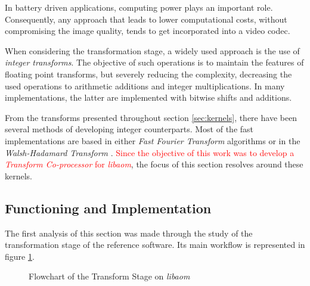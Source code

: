 In battery driven applications, computing power plays an important role. Consequently, any approach that leads to lower computational costs, without compromising the image quality, tends to get incorporated into a video codec.

When considering the transformation stage, a widely used approach is the use of \emph{integer transforms}. The objective of such operations is to maintain the features of floating point transforms, but severely reducing the complexity, decreasing the used operations to arithmetic additions and integer multiplications. In many implementations, the latter are implemented with bitwise shifts and additions.

From the transforms presented throughout section \ref{sec:kernels}, there have been several methods of developing integer counterparts. Most of the fast implementations are based in either \emph{Fast Fourier Transform} algorithms or in the \emph{Walsh-Hadamard Transform} \cite{wolterParallelArchitecturesDiscrete1992,yonghongzengIntegerDCTsFast2001}. \textcolor{red}{Since the objective of this work was to develop a \emph{Transform Co-processor} for \emph{libaom}}, the focus of this section resolves around these kernels. 

\subsection{Functioning and Implementation}

The first analysis of this section was made through the study of the transformation stage of the reference software. Its main workflow is represented in figure \ref{fig:libtrans}.

\begin{figure}[!htbp]
    \centering
    
    \caption{Flowchart of the Transform Stage on \emph{libaom}}
    \label{fig:libtrans}
\end{figure}

